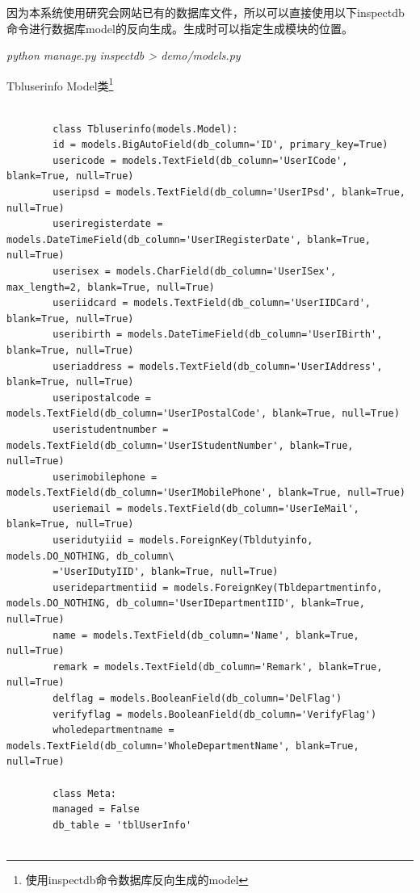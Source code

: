 \documentclass[a4paper]{ltxdoc}
\begin{document}
{		因为本系统使用研究会网站已有的数据库文件，所以可以直接使用以下inspectdb命令进行数据库model的反向生成。生成时可以指定生成模块的位置。
		
		\textit{python manage.py inspectdb > demo/models.py}
		
		Tbluserinfo Model类\footnote{使用inspectdb命令数据库反向生成的model}
		\begin{verbatim}
		
		class Tbluserinfo(models.Model):
		id = models.BigAutoField(db_column='ID', primary_key=True) 
		usericode = models.TextField(db_column='UserICode', blank=True, null=True) 
		useripsd = models.TextField(db_column='UserIPsd', blank=True, null=True) 
		useriregisterdate = models.DateTimeField(db_column='UserIRegisterDate', blank=True, null=True)  
		userisex = models.CharField(db_column='UserISex', max_length=2, blank=True, null=True)
		useriidcard = models.TextField(db_column='UserIIDCard', blank=True, null=True)  
		useribirth = models.DateTimeField(db_column='UserIBirth', blank=True, null=True)  
		useriaddress = models.TextField(db_column='UserIAddress', blank=True, null=True)  
		useripostalcode = models.TextField(db_column='UserIPostalCode', blank=True, null=True)  
		useristudentnumber = models.TextField(db_column='UserIStudentNumber', blank=True, null=True)  
		userimobilephone = models.TextField(db_column='UserIMobilePhone', blank=True, null=True)  
		useriemail = models.TextField(db_column='UserIeMail', blank=True, null=True)  
		useridutyiid = models.ForeignKey(Tbldutyinfo, models.DO_NOTHING, db_column\
		='UserIDutyIID', blank=True, null=True)  
		useridepartmentiid = models.ForeignKey(Tbldepartmentinfo, models.DO_NOTHING, db_column='UserIDepartmentIID', blank=True, null=True)  
		name = models.TextField(db_column='Name', blank=True, null=True)  
		remark = models.TextField(db_column='Remark', blank=True, null=True)  
		delflag = models.BooleanField(db_column='DelFlag')  
		verifyflag = models.BooleanField(db_column='VerifyFlag')  
		wholedepartmentname = models.TextField(db_column='WholeDepartmentName', blank=True, null=True)  
		
		class Meta:
		managed = False
		db_table = 'tblUserInfo'
		
		\end{verbatim}
		
		
}
\end{document}
